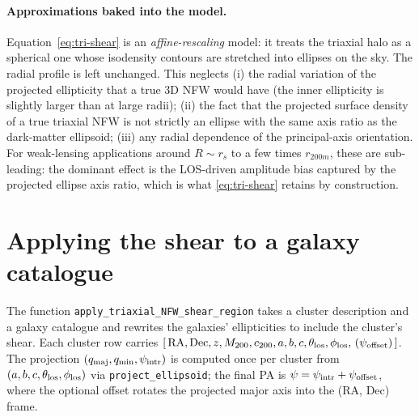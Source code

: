 \documentclass[11pt,a4paper]{article}
\begin{document}
\paragraph{Approximations baked into the model.}
Equation~\eqref{eq:tri-shear} is an \emph{affine-rescaling} model: it
treats the triaxial halo as a spherical one whose isodensity contours
are stretched into ellipses on the sky. The radial profile is left
unchanged. This neglects (i) the radial variation of the projected
ellipticity that a true 3D NFW would have (the inner ellipticity is
slightly larger than at large radii); (ii) the fact that the projected
surface density of a true triaxial NFW is not strictly an ellipse with
the same axis ratio as the dark-matter ellipsoid; (iii) any radial
dependence of the principal-axis orientation. For weak-lensing
applications around $R \sim r_s$ to a few times $r_{200m}$, these are
sub-leading: the dominant effect is the LOS-driven amplitude bias
captured by the projected ellipse axis ratio, which is what
\eqref{eq:tri-shear} retains by construction.

\section{Applying the shear to a galaxy catalogue}
\label{sec:apply}

The function \texttt{apply\_triaxial\_NFW\_shear\_region} takes a
cluster description and a galaxy catalogue and rewrites the galaxies'
ellipticities to include the cluster's shear. Each cluster row carries
$[\,\mathrm{RA}, \mathrm{Dec}, z, M_{200}, c_{200}, a, b, c,
 \theta_{\rm los}, \phi_{\rm los},\, (\psi_{\rm offset})\,]$. The
projection $(q_{\rm maj}, q_{\rm min}, \psi_{\rm intr})$ is computed
once per cluster from $(a, b, c, \theta_{\rm los}, \phi_{\rm los})$ via
\texttt{project\_ellipsoid}; the final PA is
$\psi = \psi_{\rm intr} + \psi_{\rm offset}$, where the optional offset
rotates the projected major axis into the (RA, Dec) frame.
\end{document}
